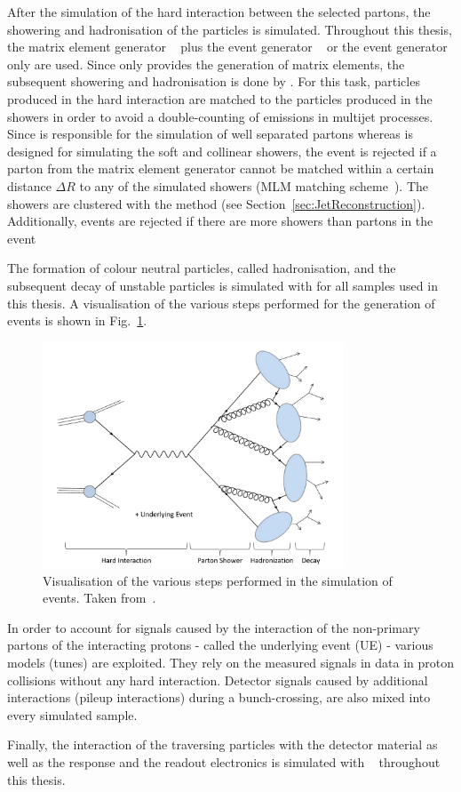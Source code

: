 After the simulation of the hard interaction between the selected partons, the showering and hadronisation of the particles is simulated.
Throughout this thesis, the matrix element generator \madgraph~\cite{bib:Madgraph_2014} plus the event generator \pythia~\cite{bib:Pyhtia6_2006} or the event generator \pythia only are used.
Since \madgraph only provides the generation of matrix elements, the subsequent showering and hadronisation is done by \pythia.
For this task, particles produced in the hard interaction are matched to the particles produced in the showers in order to avoid a double-counting of emissions in multijet processes.
Since \madgraph is responsible for the simulation of well separated partons whereas \pythia is designed for simulating the soft and collinear showers, the event is rejected if a parton from the matrix element generator cannot be matched within a certain distance $\Delta R$ to any of the simulated showers (MLM matching scheme~\cite{bib:MLM_matching}).
The showers are clustered with the \kt method (see Section~\ref{sec:JetReconstruction}).
Additionally, events are rejected if there are more showers than partons in the event

The formation of colour neutral particles, called hadronisation, and the subsequent decay of unstable particles is simulated with \pythia for all samples used in this thesis.
A visualisation of the various steps performed for the generation of events is shown in Fig.~\ref{fig:MCsimulation}. 
\begin{figure}[!b]
  \centering
      \includegraphics[width=0.80\textwidth]{figures/experiment/Simulation/MCGeneration}
  \caption{Visualisation of the various steps performed in the simulation of events. Taken from~\cite{bib:Kristin_Thesis}.}  
  \label{fig:MCsimulation}
\end{figure}

In order to account for signals caused by the interaction of the non-primary partons of the interacting protons - called the underlying event (UE) -  various models (tunes) are exploited.
They rely on the measured signals in data in proton collisions without any hard interaction.
Detector signals caused by additional interactions (pileup interactions) during a bunch-crossing, are also mixed into every simulated sample.

Finally, the interaction of the traversing particles with the detector material as well as the response and the readout electronics is simulated with \geant~\cite{bib:Geant4_2003,bib:Geant4_2006} throughout this thesis.


